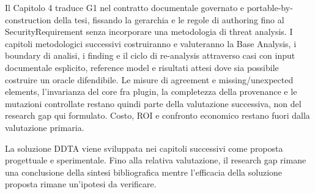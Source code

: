 \documentclass[12pt,a4paper,oneside]{report}
\begin{document}
Il Capitolo 4 traduce G1 nel contratto documentale governato e portable-by-construction della tesi, fissando la gerarchia e le regole di authoring fino al SecurityRequirement senza incorporare una metodologia di threat analysis. I capitoli metodologici successivi costruiranno e valuteranno la Base Analysis, i boundary di analisi, i finding e il ciclo di re-analysis attraverso casi con input documentale esplicito, reference model e risultati attesi dove sia possibile costruire un oracle difendibile. Le misure di agreement e missing/unexpected elements, l'invarianza del core fra plugin, la completezza della provenance e le mutazioni controllate restano quindi parte della valutazione successiva, non del research gap qui formulato. Costo, ROI e confronto economico restano fuori dalla valutazione primaria.

La soluzione DDTA viene sviluppata nei capitoli successivi come proposta progettuale e sperimentale. Fino alla relativa valutazione, il research gap rimane una conclusione della sintesi bibliografica mentre l'efficacia della soluzione proposta rimane un'ipotesi da verificare.
\end{document}

